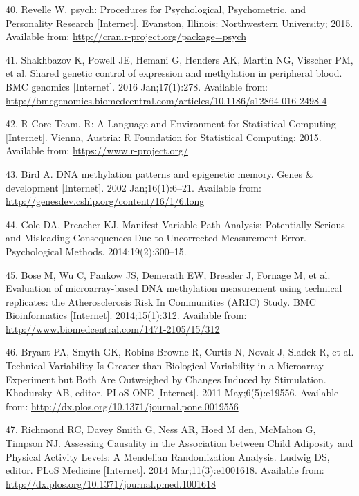 \documentclass[]{article}
\begin{document}
\hypertarget{ref-Revelle2015}{}
40. Revelle W. psych: Procedures for Psychological, Psychometric, and
Personality Research {[}Internet{]}. Evanston, Illinois: Northwestern
University; 2015. Available from:
\url{http://cran.r-project.org/package=psych}

\hypertarget{ref-Shakhbazov2016}{}
41. Shakhbazov K, Powell JE, Hemani G, Henders AK, Martin NG, Visscher
PM, et al. Shared genetic control of expression and methylation in
peripheral blood. BMC genomics {[}Internet{]}. 2016 Jan;17(1):278.
Available from:
\url{http://bmcgenomics.biomedcentral.com/articles/10.1186/s12864-016-2498-4}

\hypertarget{ref-RCoreTeam2015}{}
42. R Core Team. R: A Language and Environment for Statistical Computing
{[}Internet{]}. Vienna, Austria: R Foundation for Statistical Computing;
2015. Available from: \url{https://www.r-project.org/}

\hypertarget{ref-Bird2002}{}
43. Bird A. DNA methylation patterns and epigenetic memory. Genes \&
development {[}Internet{]}. 2002 Jan;16(1):6--21. Available from:
\url{http://genesdev.cshlp.org/content/16/1/6.long}

\hypertarget{ref-Cole2014}{}
44. Cole DA, Preacher KJ. Manifest Variable Path Analysis: Potentially
Serious and Misleading Consequences Due to Uncorrected Measurement
Error. Psychological Methods. 2014;19(2):300--15.

\hypertarget{ref-Bose2014}{}
45. Bose M, Wu C, Pankow JS, Demerath EW, Bressler J, Fornage M, et al.
Evaluation of microarray-based DNA methylation measurement using
technical replicates: the Atherosclerosis Risk In Communities (ARIC)
Study. BMC Bioinformatics {[}Internet{]}. 2014;15(1):312. Available
from: \url{http://www.biomedcentral.com/1471-2105/15/312}

\hypertarget{ref-Bryant2011}{}
46. Bryant PA, Smyth GK, Robins-Browne R, Curtis N, Novak J, Sladek R,
et al. Technical Variability Is Greater than Biological Variability in a
Microarray Experiment but Both Are Outweighed by Changes Induced by
Stimulation. Khodursky AB, editor. PLoS ONE {[}Internet{]}. 2011
May;6(5):e19556. Available from:
\url{http://dx.plos.org/10.1371/journal.pone.0019556}

\hypertarget{ref-Richmond2014}{}
47. Richmond RC, Davey Smith G, Ness AR, Hoed M den, McMahon G, Timpson
NJ. Assessing Causality in the Association between Child Adiposity and
Physical Activity Levels: A Mendelian Randomization Analysis. Ludwig DS,
editor. PLoS Medicine {[}Internet{]}. 2014 Mar;11(3):e1001618. Available
from: \url{http://dx.plos.org/10.1371/journal.pmed.1001618}
\end{document}
